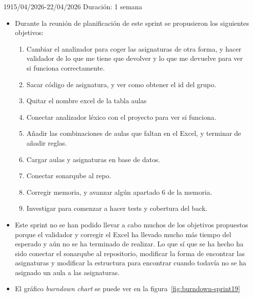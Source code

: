 \begin{Sprint}{19}{15/04/2026-22/04/2026}
	Duración: 1 semana
	\begin{itemize}	
		\item{}
		Durante la reunión de planificación de este sprint se propusieron los siguientes objetivos:
		\begin{enumerate}
			\item Cambiar el analizador para coger las asignaturas de otra forma, y hacer validador de lo que me tiene que devolver y lo que me devuelve para ver si funciona correctamente.
			\item Sacar código de asignatura, y ver como obtener el id del grupo.
			\item Quitar el nombre excel de la tabla aulas
			\item Conectar analizador léxico con el proyecto para ver si funciona.
			\item Añadir las combinaciones de aulas que faltan en el Excel, y terminar de añadir reglas.
			\item Cargar aulas y asignaturas en base de datos.
			\item Conectar sonarqube al repo.
			\item Corregir memoria, y avanzar algún apartado 6 de la memoria.
			\item Investigar para comenzar a hacer tests y cobertura del back.
		\end{enumerate}
		\item{}
		Este sprint no se han podido llevar a cabo muchos de los objetivos propuestos porque el validador y corregir el Excel ha llevado mucho más tiempo del esperado y aún no se ha terminado de realizar. Lo que sí que se ha hecho ha sido conectar el sonarqube al repositorio, modificar la forma de encontrar las asignaturas y modificar la estructura para encontrar cuando todavía no se ha asignado un aula a las asignaturas.
		
		
		\item{}
		El gráfico \textit{burndown chart} se puede ver en la figura~\ref{fig:burndown-sprint19}
	\end{itemize}
\end{Sprint}

